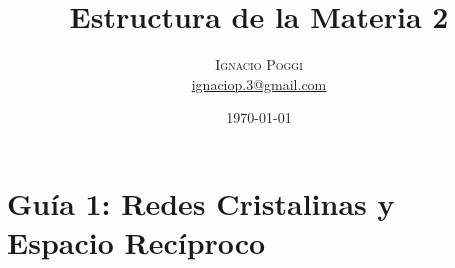 \documentclass[a4paper]{article}
\title{Estructura de la Materia 2} %
\author{%
\textsc{Ignacio Poggi} \\[1ex] %
\normalsize \href{mailto:ignaciop.3@gmail.com}{ignaciop.3@gmail.com} %
}
\date{\today} %
\begin{document}
\maketitle



\tableofcontents


\section{Gu\'ia 1: Redes Cristalinas y Espacio Rec\'iproco}

\subsection{}
\end{document}
